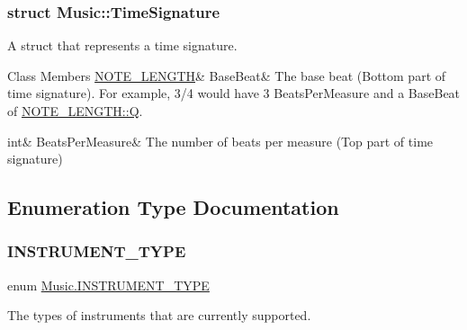 \subsubsection{struct Music\+:\+:Time\+Signature}
A struct that represents a time signature. \begin{DoxyFields}{Class Members}
\mbox{\label{group___enums_aaf5b010a2541959c26f96630db042ee8}} 
\hyperlink{group___enums_gaf11b5f079adbb21c800b9eca1c5c3cbd}{NOTE\_LENGTH}&
BaseBeat&
The base beat (Bottom part of time signature). For example, 3/4 would have 3 Beats\+Per\+Measure and a Base\+Beat of \hyperlink{group___enums_ggaf11b5f079adbb21c800b9eca1c5c3cbdaf09564c9ca56850d4cd6b3319e541aee}{N\+O\+T\+E\+\_\+\+L\+E\+N\+G\+T\+H\+::Q}. \\
\hline

\mbox{\label{group___enums_acda79d249e7a1974a152832a881e9f0b}} 
int&
BeatsPerMeasure&
The number of beats per measure (Top part of time signature) \\
\hline

\end{DoxyFields}


\subsection{Enumeration Type Documentation}
\mbox{\label{group___enums_gabfce60192305965558a36e368ebd67c3}} 
\subsubsection{\texorpdfstring{I\+N\+S\+T\+R\+U\+M\+E\+N\+T\+\_\+\+T\+Y\+PE}{INSTRUMENT\_TYPE}}
{\footnotesize\ttfamily enum \hyperlink{group___enums_gabfce60192305965558a36e368ebd67c3}{Music.\+I\+N\+S\+T\+R\+U\+M\+E\+N\+T\+\_\+\+T\+Y\+PE}\hspace{0.3cm}{\ttfamily [strong]}}



The types of instruments that are currently supported. 

